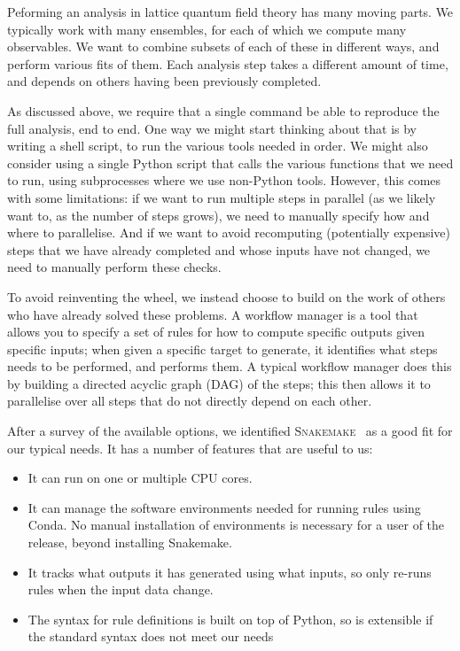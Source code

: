 \documentclass{article}
\newcommand\program[1]{\textsc{#1}\xspace}
\begin{document}
Peforming an analysis in lattice quantum field theory has many moving parts.
We typically work with many ensembles,
for each of which we compute many observables.
We want to combine subsets of each of these in different ways,
and perform various fits of them.
Each analysis step takes a different amount of time,
and depends on others having been previously completed.

As discussed above,
we require that a single command be able to reproduce the full analysis,
end to end.
One way we might start thinking about that is by writing a shell script,
to run the various tools needed in order.
We might also consider using a single Python script
that calls the various functions that we need to run,
using subprocesses where we use non-Python tools.
However,
this comes with some limitations:
if we want to run multiple steps in parallel
(as we likely want to,
as the number of steps grows),
we need to manually specify how and where to parallelise.
And if we want to avoid recomputing
(potentially expensive)
steps that we have already completed
and whose inputs have not changed,
we need to manually perform these checks.

To avoid reinventing the wheel,
we instead choose to build on the work of others who have already solved these problems.
A workflow manager is a tool that allows you to specify
a set of rules for how to compute specific outputs given specific inputs;
when given a specific target to generate,
it identifies what steps needs to be performed,
and performs them.
A typical workflow manager does this
by building a directed acyclic graph
(DAG)
of the steps;
this then allows it to parallelise over all steps that do not directly depend on each other.

After a survey of the available options,
we identified \program{Snakemake}~\cite{molder2021sustainable} as a good fit for our typical needs.
It has a number of features that are useful to us:

\begin{itemize}
  \item
        It can run on one or multiple CPU cores.
  \item
        It can manage the software environments needed for running rules using Conda.
        No manual installation of environments is necessary for a user of the release,
        beyond installing Snakemake.
  \item
        It tracks what outputs it has generated using what inputs,
        so only re-runs rules when the input data change.
  \item
        The syntax for rule definitions is built on top of Python,
        so is extensible if the standard syntax does not meet our needs
\end{itemize}
\end{document}
